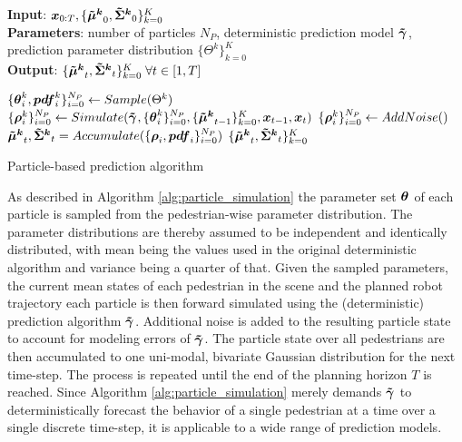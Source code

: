\begin{algorithm}[H]
\setstretch{\algorithmstretch}

\textbf{Input}: $\x_{0:T}, \{\muped[k]_0, \sigmaped[k]_0\}_{k=0}^K$ \\
\textbf{Parameters}: number of particles $N_P$, deterministic prediction model $\distmodeldet[]$, prediction parameter distribution $\{\Theta^k\}_{k=0}^K$ \\
\textbf{Output}: $\{\muped[k]_t, \sigmaped[k]_t\}_{k=0}^K \; \forall t \in [1, T]$
\begin{algorithmic}[1]
		\State $\{ \pparam[k]_i, \boldsymbol{pdf}^k_i \}_{i=0}^{N_P} \gets Sample(\Theta^k)$
		\State $\{ \pstate[k]_i \}_{i=0}^{N_P} \gets Simulate(\distmodeldet[], \{ \pparam[k]_i \}_{i=0}^{N_P}, \{ \muped[k]_{t-1} \}_{k=0}^K, \x_{t-1}, \x_t)$
		\State $\{ \pstate[k]_i \}_{i=0}^{N_P} \gets AddNoise()$
	\EndFor
	\State $\muped[k]_t, \sigmaped[k]_t = Accumulate(\{ \pstate[]_i, \boldsymbol{pdf}_i \}_{i=0}^{N_P})$
\EndFor
\Return $\{ \muped[k]_t, \sigmaped[k]_t \}_{k=0}^K$
\end{algorithmic}
\caption{Particle-based prediction algorithm}
\label{alg:particle_simulation}
\end{algorithm}

As described in Algorithm \ref{alg:particle_simulation} the parameter set $\pparam[]$ of each particle is sampled from the pedestrian-wise parameter distribution. The parameter distributions are thereby assumed to be independent and identically distributed, with mean being the values used in the original deterministic algorithm and variance being a quarter of that. Given the sampled parameters, the current mean states of each pedestrian in the scene and the planned robot trajectory each particle is then forward simulated using the (deterministic) prediction algorithm $\distmodeldet[]$. Additional noise is added to the resulting particle state to account for modeling errors of $\distmodeldet[]$. The particle state over all pedestrians are then accumulated to one uni-modal, bivariate Gaussian distribution for the next time-step. The process is repeated until the end of the planning horizon $T$ is reached. Since Algorithm \ref{alg:particle_simulation} merely demands $\distmodeldet[]$ to deterministically forecast the behavior of a single pedestrian at a time over a single discrete time-step, it is applicable to a wide range of prediction models. 

